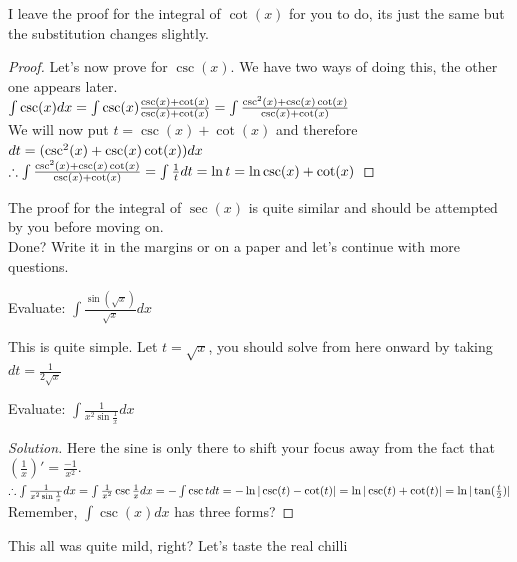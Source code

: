 I leave the proof for the integral of $\cot(x)$ for you to do, its just the same but the substitution changes slightly.\\
\begin{proof}
    Let's now prove for $\csc(x)$. We have two ways of doing this, the other one appears later.\\
    $\int \csc(x) dx\\
    = \int \csc(x) \frac{\csc(x)+\cot(x)}{\csc(x)+\cot(x)}\\
    = \int \frac{\csc^2(x)+\csc(x)\cot(x)}{\csc(x)+\cot(x)}$\\
    We will now put $t=\csc(x)+\cot(x)$ and therefore $dt=(\csc^2(x)+\csc(x)\cot(x))dx\\$\\
    $\therefore \int \frac{\csc^2(x)+\csc(x)\cot(x)}{\csc(x)+\cot(x)}\\
    =\int \frac{1}{t} dt\\
    = \ln{t}\\
    = \ln{\csc(x)+\cot(x)}$
\end{proof}
The proof for the integral of $\sec(x)$ is quite similar and should be attempted by you before moving on.\\
Done? Write it in the margins or on a paper and let's continue with more questions.\\
\begin{example}
    Evaluate: $\int \frac{\sin(\sqrt{x})}{\sqrt{x}} dx$
\end{example}
This is quite simple. Let $t=\sqrt{x}$, you  should solve from here onward by taking $dt=\frac{1}{2\sqrt{x}}$
\begin{example}
    Evaluate: $\int \frac{1}{x^2 \sin{\frac{1}{x}}} dx$
\end{example}
\begin{proof}
    [Solution]
    Here the sine is only there to shift your focus away from the fact that $(\frac{1}{x})'=\frac{-1}{x^2}$.\\
    $\therefore \int \frac{1}{x^2 \sin{\frac{1}{x}}} dx\\
    = \int \frac{1}{x^2} \csc{\frac{1}{x}}dx\\
    = -\int \csc{t} dt\\
    = -\ln{|\csc(t)-\cot(t)|}\\
    =\ln{|\csc(t)+\cot(t)|}\\
    = \ln{|\tan(\frac{t}{2})|}$
    Remember, $\int \csc(x) dx$ has three forms?
\end{proof}
This all was quite mild, right? Let's taste the real chilli\\
